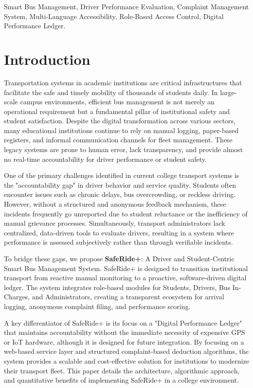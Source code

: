 \documentclass[conference]{IEEEtran}
\begin{document}
\begin{IEEEkeywords}
Smart Bus Management, Driver Performance Evaluation, Complaint Management System, Multi-Language Accessibility, Role-Based Access Control, Digital Performance Ledger.
\end{IEEEkeywords}

\section{Introduction}
Transportation systems in academic institutions are critical infrastructures that facilitate the safe and timely mobility of thousands of students daily. In large-scale campus environments, efficient bus management is not merely an operational requirement but a fundamental pillar of institutional safety and student satisfaction. Despite the digital transformation across various sectors, many educational institutions continue to rely on manual logging, paper-based registers, and informal communication channels for fleet management. These legacy systems are prone to human error, lack transparency, and provide almost no real-time accountability for driver performance or student safety.

One of the primary challenges identified in current college transport systems is the "accountability gap" in driver behavior and service quality. Students often encounter issues such as chronic delays, bus overcrowding, or reckless driving. However, without a structured and anonymous feedback mechanism, these incidents frequently go unreported due to student reluctance or the inefficiency of manual grievance processes. Simultaneously, transport administrators lack centralized, data-driven tools to evaluate drivers, resulting in a system where performance is assessed subjectively rather than through verifiable incidents.

To bridge these gaps, we propose \textbf{SafeRide+}: A Driver and Student-Centric Smart Bus Management System. SafeRide+ is designed to transition institutional transport from reactive manual monitoring to a proactive, software-driven digital ledger. The system integrates role-based modules for Students, Drivers, Bus In-Charges, and Administrators, creating a transparent ecosystem for arrival logging, anonymous complaint filing, and performance scoring.

A key differentiator of SafeRide+ is its focus on a "Digital Performance Ledger" that maintains accountability without the immediate necessity of expensive GPS or IoT hardware, although it is designed for future integration. By focusing on a web-based service layer and structured complaint-based deduction algorithms, the system provides a scalable and cost-effective solution for institutions to modernize their transport fleet. This paper details the architecture, algorithmic approach, and quantitative benefits of implementing SafeRide+ in a college environment.
\end{document}
